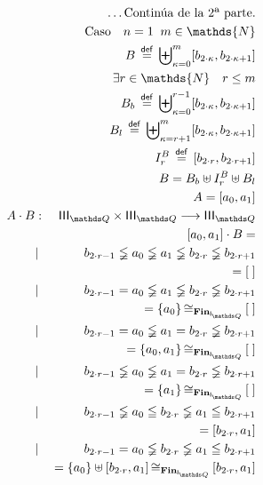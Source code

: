 \documentclass[final,12pt,a4paper,twoside,fleqn]{extbook}
\newcommand{\fromto}{\ensuremath{\longrightarrow}}
\newcommand{\mathdef}{\ensuremath{\stackrel{\mathsf{def}}{{}={}}}}
\newcommand{\set}[1]{\ensuremath{\left\lbrace{#1}\right\rbrace}}
\newcommand{\setN}{\ensuremath{\mathds{N}}}
\theoremstyle{definition}
\theoremstyle{remark}
\begin{document}
\begin{eqnarray}
\nonumber
&&\ldots\text{Continúa de la 2ª parte.}\\
&&\text{Caso}\quad n = 1 \;\; m \in \setN\\
&&B \mathdef {\biguplus}_{\kappa=0}^{m} {\left[b_{2\cdot \kappa},b_{2\cdot
\kappa + 1}\right]}\\
&&\exists r \in \setN \quad r \leq m\\
\qquad&& B_b \mathdef {\biguplus}_{\kappa=0}^{r-1} {\left[b_{2\cdot
\kappa},b_{2\cdot \kappa + 1}\right]}\\
\qquad&& B_l \mathdef {\biguplus}_{\kappa=r+1}^{m} {\left[b_{2\cdot
\kappa},b_{2\cdot \kappa + 1}\right]}\\
\qquad&& I_r^B \mathdef {\left[b_{2\cdot r},b_{2\cdot r + 1}\right]}\\
&&B = B_b \uplus I_r^B \uplus B_l\\
&&A = \left[a_0,a_1\right]\\
A \cdot B &:& \IIIQ \times \IIIQ \fromto \IIIQ\\
      &&\left[a_0,a_1\right] \cdot B =\\
      &|& b_{2\cdot r-1} \lneqq a_0 \lneqq a_1 \lneqq b_{2\cdot r} \lneqq
      b_{2\cdot r+1}\\
      \qquad&&= \left[\;\right]\\
      &|& b_{2\cdot r-1} = a_0 \lneqq a_1 \lneqq b_{2\cdot r} \lneqq
      b_{2\cdot r+1}\\
      \qquad&&= \set{a_0} {\cong}_{\mathbf{Fin}_{\IQ}} \left[\;\right] \\
      &|& b_{2\cdot r-1} = a_0 \lneqq a_1 = b_{2\cdot r} \lneqq
      b_{2\cdot r+1}\\
      \qquad&&= \set{a_0,a_1} {\cong}_{\mathbf{Fin}_{\IQ}} \left[\;\right] \\
      &|& b_{2\cdot r-1} \lneqq a_0 \lneqq a_1 = b_{2\cdot r} \lneqq
      b_{2\cdot r+1}\\
      \qquad&&= \set{a_1} {\cong}_{\mathbf{Fin}_{\IQ}} \left[\;\right] \\ 
      &|& b_{2\cdot r-1} \lneqq a_0 \leqq b_{2\cdot r} \lneqq a_1 \leqq
      b_{2\cdot r+1}\\
      \qquad&&= \left[b_{2\cdot r},a_1\right]\\
      &|& b_{2\cdot r-1} = a_0 \lneqq b_{2\cdot r} \lneqq a_1 \leqq
      b_{2\cdot r+1}\\
      \qquad&&= \set{a_0} \uplus \left[b_{2\cdot r},a_1\right]
      {\cong}_{\mathbf{Fin}_{\IQ}} \left[b_{2\cdot r},a_1\right] \\

\end{eqnarray}
\end{document}
